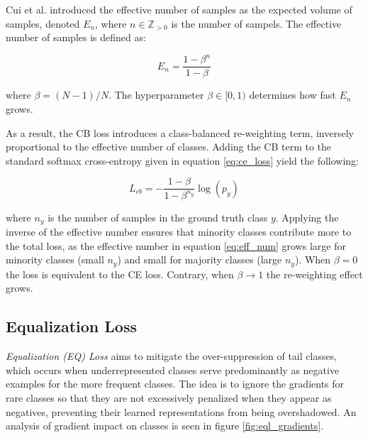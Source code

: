 \noindent Cui et al. \cite{cui2019classbalancedlossbasedeffective} introduced the effective number of samples as the expected volume of samples, denoted $E_n$, where $n \in \mathbb{Z}_{>0}$ is the number of sampels. The effective number of samples 
is defined as:

\begin{equation}
    \label{eq:eff_num}
    E_n = \frac{1-\beta^n}{1-\beta}
\end{equation}

\noindent where $\beta = (N-1)/N$. The hyperparameter $\beta \in [0,1)$ determines how fast $E_n$ grows.

As a result, the CB loss introduces a class-balanced re-weighting term, inversely proportional to the effective number of classes. Adding the CB term to the standard softmax cross-entropy given in equation \eqref{eq:ce_loss} yield the following:

\begin{equation}
    \label{eq:cb_loss}
    L_{cb} = - \frac{1 - \beta}{1 - \beta^{n_y}} \log(p_y)
\end{equation}

\noindent where $n_y$ is the number of samples in the ground truth class $y$. Applying the inverse of the effective number ensures that minority classes contribute more to the total loss, as the effective number in equation \eqref{eq:eff_num} grows large for minority classes (small $n_y$) and small for majority classes (large $n_y$). When $\beta = 0$ the loss is equivalent to the CE loss. Contrary, when $\beta \longrightarrow 1$ the re-weighting effect grows.




\subsection{Equalization Loss}
\label{sec:seql}
\emph{Equalization (EQ) Loss} \cite{tan2020equalizationlosslongtailedobject} aims to mitigate the over-suppression of tail classes, which occurs when underrepresented classes serve predominantly as negative examples for the more frequent classes. The idea is to ignore the gradients for rare classes so that they are not excessively penalized when they appear as negatives, preventing their learned representations from being overshadowed. An analysis of gradient impact on classes is seen in figure \ref{fig:eql_gradients}.

